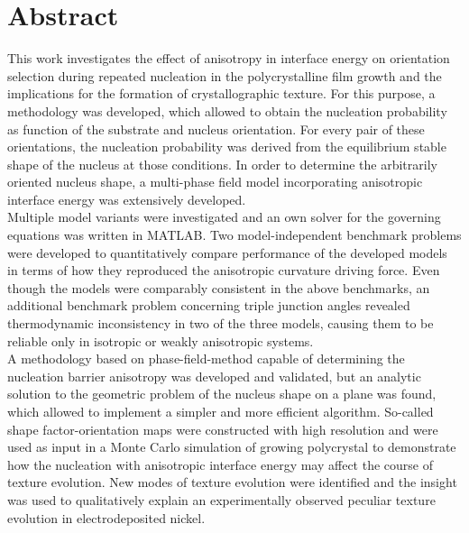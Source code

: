 \chapter{Abstract}                                 \label{ch:abstract}
This work investigates the effect of anisotropy in interface energy on orientation selection during repeated nucleation in the polycrystalline film growth and the implications for the formation of crystallographic texture. For this purpose, a methodology was developed, which allowed to obtain the nucleation probability as function of the substrate and nucleus orientation. For every pair of these orientations, the nucleation probability was derived from the equilibrium stable shape of the nucleus at those conditions. In order to determine the arbitrarily oriented nucleus shape, a multi-phase field model incorporating anisotropic interface energy was extensively developed.  \\
Multiple model variants were investigated and an own solver for the governing equations was written in MATLAB. Two model-independent benchmark problems were developed to quantitatively compare performance of the developed models in terms of how they reproduced the anisotropic curvature driving force. Even though the models were comparably consistent in the above benchmarks, an additional benchmark problem concerning triple junction angles revealed thermodynamic inconsistency in two of the three models, causing them to be reliable only in isotropic or weakly anisotropic systems.\\
A methodology based on phase-field-method capable of determining the nucleation barrier anisotropy was developed and validated, but an analytic solution to the geometric problem of the nucleus shape on a plane was found, which allowed to implement a simpler and more efficient algorithm. So-called shape factor-orientation maps were constructed with high resolution and were used as input in a Monte Carlo simulation of growing polycrystal to demonstrate how the nucleation with anisotropic interface energy may affect the course of texture evolution. New modes of texture evolution were identified and the insight was used to qualitatively explain an experimentally observed peculiar texture evolution in electrodeposited nickel. 


